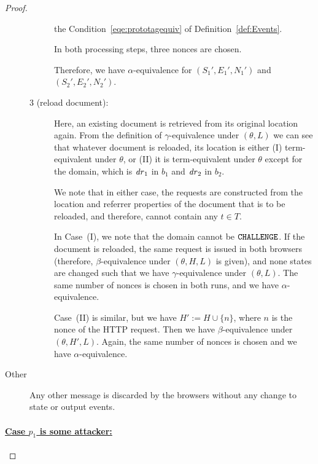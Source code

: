 \begin{theorem}
\begin{proof}
\begin{description}
\begin{description}
        the Condition~\ref{eqe:prototagequiv} of 
        Definition~\ref{def:Events}.
  
        In both processing steps, three nonces are chosen.
  
        Therefore, we have $\alpha$-equivalence for $(S_1',E_1',N_1')$
        and $(S_2',E_2',N_2')$.
        \item[3 (reload document):]
        Here, an existing document is
        retrieved from its original location again. From the definition
        of $\gamma$-equivalence under $(\theta,L)$ we can see that
        whatever document is reloaded, its location is either (I)
        term-equivalent under $\theta$, or (II) it is term-equivalent
        under $\theta$ except for the domain, which is $\mathit{dr}_1$ in
        $b_1$ and $\mathit{dr}_2$ in $b_2$. 
  
        We note that in either case, the requests are constructed from
        the location and referrer properties of the document that is to
        be reloaded, and therefore, cannot contain any $t\in T$.
  
        In Case~(I), we note that the domain cannot be
        $\mathtt{CHALLENGE}$. If the document is reloaded, the same 
        request is issued in both browsers (therefore,
        $\beta$-equivalence under $(\theta, H, L)$ is given), and 
        none states are changed such that we have
        $\gamma$-equivalence under $(\theta, L)$. The same number of
        nonces is chosen in both runs, and we have
        $\alpha$-equivalence.
  
        Case~(II) is similar, but we have $H' := H \cup \{n\}$, where
        $n$ is the nonce of the HTTP request. 
        Then we have $\beta$-equivalence under
        $(\theta,H',L)$. Again, the same number of nonces is chosen and
        we have $\alpha$-equivalence. 
        \end{description}
      \item[Other] Any other message is discarded by the browsers 
        without any change to state or output events.
    \end{description}
  
    \paragraph{\underline{Case $p_1$ is some attacker:}}


\end{proof}
\end{theorem}
